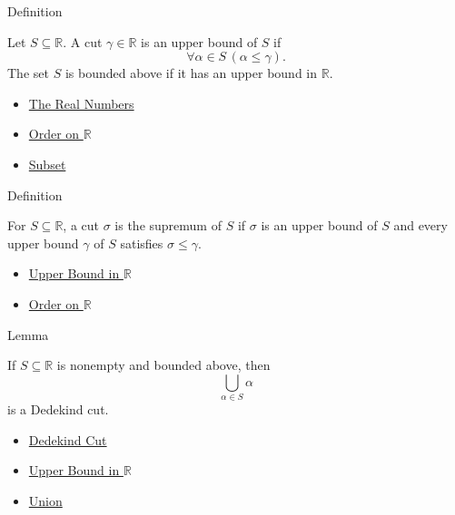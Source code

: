 \begin{definitionbox}{Definition}
\begin{definition}
\label{def:upper-bound-in-r}
Let $S\subseteq\mathbb{R}$. A cut $\gamma\in\mathbb{R}$ is an upper bound of $S$
if
\[
\forall\alpha\in S\,(\alpha\le\gamma).
\]
The set $S$ is bounded above if it has an upper bound in $\mathbb{R}$.
\end{definition}
\end{definitionbox}

\begin{dependencies}
\begin{itemize}
  \item \hyperref[def:reals]{The Real Numbers}
  \item \hyperref[def:order-on-r]{Order on $\mathbb{R}$}
  \item \hyperref[def:subset]{Subset}
\end{itemize}
\end{dependencies}

\begin{definitionbox}{Definition}
\begin{definition}
\label{def:supremum-in-r}
For $S\subseteq\mathbb{R}$, a cut $\sigma$ is the supremum of $S$ if $\sigma$
is an upper bound of $S$ and every upper bound $\gamma$ of $S$ satisfies
$\sigma\le\gamma$.
\end{definition}
\end{definitionbox}

\begin{dependencies}
\begin{itemize}
  \item \hyperref[def:upper-bound-in-r]{Upper Bound in $\mathbb{R}$}
  \item \hyperref[def:order-on-r]{Order on $\mathbb{R}$}
\end{itemize}
\end{dependencies}

\begin{lemmabox}{Lemma}
\begin{lemma}
\label{lem:union-of-cuts-is-a-cut}
If $S\subseteq\mathbb{R}$ is nonempty and bounded above, then
\[
\bigcup_{\alpha\in S}\alpha
\]
is a Dedekind cut.
\end{lemma}
\end{lemmabox}

\begin{dependencies}
\begin{itemize}
  \item \hyperref[def:dedekind-cut]{Dedekind Cut}
  \item \hyperref[def:upper-bound-in-r]{Upper Bound in $\mathbb{R}$}
  \item \hyperref[def:union]{Union}
\end{itemize}
\end{dependencies}

